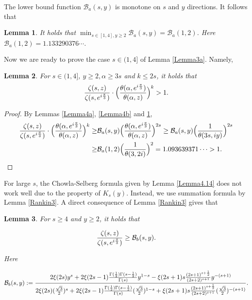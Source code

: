 \documentclass[reqno,english]{amsart}
\newtheorem{lemma}{Lemma}[section]
\newtheorem{open problem}{Open Problem}[section]
\newtheorem{open question}{Open Question}[section]
\newtheorem{open questions on hexagonal lattice}{Open Questions on hexagonal lattice}[section]
\begin{document}
The lower bound function $\mathcal{B}_a(s,y)$ is monotone on $s$ and $y$ directions. It follows that
\begin{lemma}\label{Lemma4c}It holds that $\min_{s\in[1,4], y\geq2}\mathcal{B}_a(s,y)=\mathcal{B}_a(1,2)$. Here
$\mathcal{B}_a(1,2)=1.133290376\cdots$.

\end{lemma}
Now we are ready to prove the case $s\in(1,4]$ of Lemma \ref{Lemma3a}. Namely,
\begin{lemma}\label{L31}
For $s\in(1,4]$, $y\geq2, \alpha\geq3s$ and $k\leq2s$, it holds that
\begin{equation}\aligned\nonumber
\frac{\zeta(s,z)}{\zeta(s,e^{i\frac{\pi}{3}})}\cdot\Big(\frac{\theta(\alpha,e^{i\frac{\pi}{3}})}{\theta(\alpha,z)}\Big)^{k}>1.
 \endaligned\end{equation}

\end{lemma}

\begin{proof} By Lemmas \ref{Lemma4a}, \ref{Lemma4b} and \ref{Lemma4c},
\begin{equation}\aligned\nonumber
\frac{\zeta(s,z)}{\zeta(s,e^{i\frac{\pi}{3}})}\cdot\Big(\frac{\theta(\alpha,e^{i\frac{\pi}{3}})}{\theta(\alpha,z)}\Big)^{k}
\geq &\mathcal{B}_a(s,y)\Big(\frac{\theta(\alpha,e^{i\frac{\pi}{3}})}{\theta(\alpha,z)}\Big)^{2s}
\geq \mathcal{B}_a(s,y)\Big(\frac{1}{\theta(3s,iy)}\Big)^{2s}\\
\geq &\mathcal{B}_a(1,2)\Big(\frac{1}{\theta(3,2i)}\Big)^{2}=1.093639371\cdots
>1.
 \endaligned\end{equation}

\end{proof}

For large $s$, the Chowla-Selberg formula given by Lemma \ref{Lemma4.14} does not work  well due to the property of $K_s(y)$. Instead, we use
summation formula by Lemma \ref{Rankin3}. A direct consequence of Lemma \ref{Rankin3} gives that
\begin{lemma}\label{Lemma4d}
For $s\geq4$ and $y\geq2$, it holds that

 \begin{equation}\aligned\nonumber
\frac{\zeta(s,z)}{\zeta(s,e^{i\frac{\pi}{3}})}\geq
\mathcal{B}_b(s,y).
\endaligned\end{equation}

Here

 \begin{equation}\aligned\nonumber
\mathcal{B}_b(s,y):=
\frac{2\xi(2s)y^s+
2\xi(2s-1)\frac{\Gamma(\frac{1}{2})\Gamma(s-\frac{1}{2})}{\Gamma(s)}y^{1-s}
-\xi(2s+1)s\frac{(2s+1)^{s+\frac{1}{2}}}{(2s+2)^{s+1}}y^{-(s+1)}}
{2\xi(2s)(\frac{\sqrt3}{2})^s+
2\xi(2s-1)\frac{\Gamma(\frac{1}{2})\Gamma(s-\frac{1}{2})}{\Gamma(s)}(\frac{\sqrt3}{2})^{1-s}
+\xi(2s+1)s\frac{(2s+1)^{s+\frac{1}{2}}}{(2s+2)^{s+1}}(\frac{\sqrt3}{2})^{-(s+1)}}.
\endaligned\end{equation}

\end{lemma}
\end{document}
